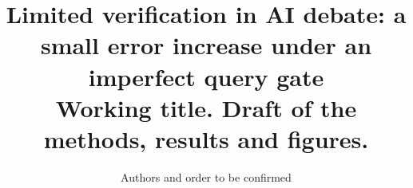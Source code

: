 \documentclass{article}
\title{Limited verification in AI debate: a small error increase under an imperfect query gate\\[2pt]
{\normalsize\normalfont Working title. Draft of the methods, results and figures.}}
\author{Authors and order to be confirmed}
\date{}
\begin{document}
\maketitle

\begin{abstract}

\end{abstract}








% 
% 

\clearpage
\appendix

\end{document}
